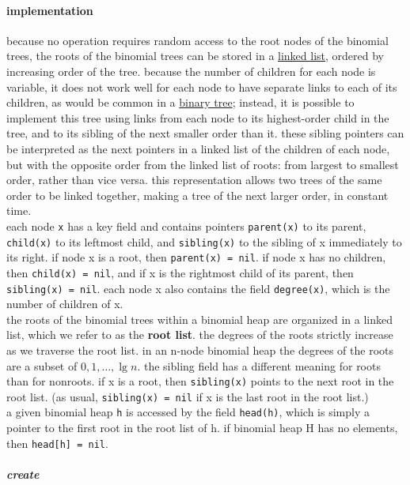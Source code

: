\documentclass[a4paper,12pt]{article}
\begin{document}
\paragraph{implementation}
\label{sec:orge873736}
because no operation requires random access to the root nodes of the binomial trees, the roots of the binomial trees can be stored in a \hyperref[sec:org3b67cf5]{linked list}, ordered by increasing order of the tree. because the number of children for each node is variable, it does not work well for each node to have separate links to each of its children, as would be common in a \hyperref[sec:org254f5f7]{binary tree}; instead, it is possible to implement this tree using links from each node to its highest-order child in the tree, and to its sibling of the next smaller order than it. these sibling pointers can be interpreted as the next pointers in a linked list of the children of each node, but with the opposite order from the linked list of roots: from largest to smallest order, rather than vice versa. this representation allows two trees of the same order to be linked together, making a tree of the next larger order, in constant time.\\[0pt]
each node \texttt{x} has a key field and contains pointers \texttt{parent(x)} to its parent, \texttt{child(x)} to its leftmost child, and \texttt{sibling(x)} to the sibling of x immediately to its right. if node x is a root, then \texttt{parent(x) = nil}. if node x has no children, then \texttt{child(x) = nil}, and if x is the rightmost child of its parent, then \texttt{sibling(x) = nil}. each node x also contains the field \texttt{degree(x)}, which is the number of children of x.\\[0pt]
the roots of the binomial trees within a binomial heap are organized in a linked list, which we refer to as the \textbf{root list}. the degrees of the roots strictly increase as we traverse the root list. in an n-node binomial heap the degrees of the roots are a subset of \({0,1,\ldots,\lg n}\). the sibling field has a different meaning for roots than for nonroots. if x is a root, then \texttt{sibling(x)} points to the next root in the root list. (as usual, \texttt{sibling(x) = nil} if x is the last root in the root list.)\\[0pt]
a given binomial heap \texttt{h} is accessed by the field \texttt{head(h)}, which is simply a pointer to the first root in the root list of h. if binomial heap H has no elements, then \texttt{head[h] = nil}.\\[0pt]
\subparagraph{create}
\label{sec:orgb19781c}
\end{document}
